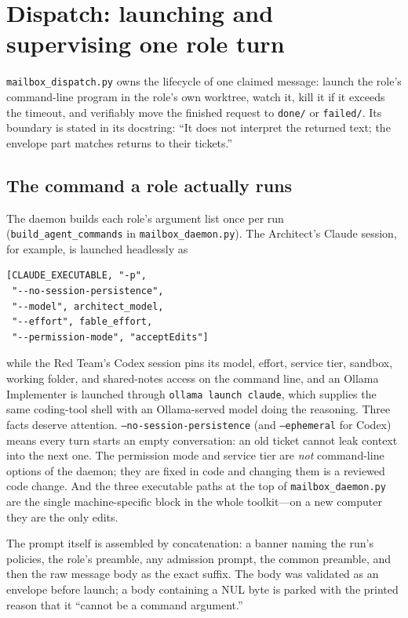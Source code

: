 \documentclass[10pt,aps,prd,twocolumn,nofootinbib]{revtex4-2}
\newcommand{\code}[1]{\texttt{#1}}
\newcommand{\file}[1]{\texttt{#1}}
\begin{document}
\section{Dispatch: launching and supervising one role turn}
\label{sec:dispatch}

\file{mailbox\_dispatch.py} owns the lifecycle of one claimed message:
launch the role's command-line program in the role's own worktree,
watch it, kill it if it exceeds the timeout, and verifiably move the
finished request to \file{done/} or \file{failed/}.  Its boundary is
stated in its docstring: ``It does not interpret the returned text;
the envelope part matches returns to their tickets.''

\subsection{The command a role actually runs}

The daemon builds each role's argument list once per run
(\code{build\_agent\_commands} in \file{mailbox\_daemon.py}).  The
Architect's Claude session, for example, is launched headlessly as

\begin{verbatim}
[CLAUDE_EXECUTABLE, "-p",
 "--no-session-persistence",
 "--model", architect_model,
 "--effort", fable_effort,
 "--permission-mode", "acceptEdits"]
\end{verbatim}

\noindent while the Red Team's Codex session pins its model, effort,
service tier, sandbox, working folder, and shared-notes access on the
command line, and an Ollama Implementer is launched through
\code{ollama launch claude}, which supplies the same coding-tool shell
with an Ollama-served model doing the reasoning.  Three facts deserve
attention.  \code{--no-session-persistence} (and \code{--ephemeral}
for Codex) means every turn starts an empty conversation: an old
ticket cannot leak context into the next one.  The permission mode and
service tier are \emph{not} command-line options of the daemon; they
are fixed in code and changing them is a reviewed code change.  And
the three executable paths at the top of \file{mailbox\_daemon.py} are
the single machine-specific block in the whole toolkit---on a new
computer they are the only edits.

The prompt itself is assembled by concatenation: a banner naming the
run's policies, the role's preamble, any admission prompt, the common
preamble, and then the raw message body as the exact suffix.  The body
was validated as an envelope before launch; a body containing a NUL
byte is parked with the printed reason that it ``cannot be a command
argument.''
\end{document}
